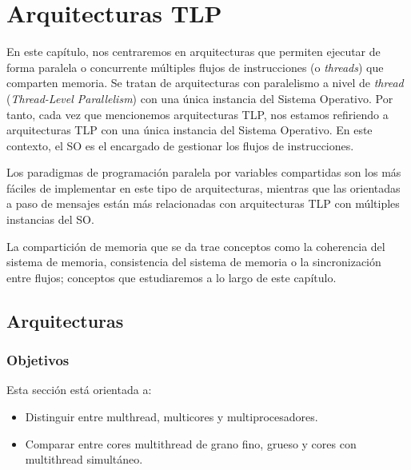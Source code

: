 \chapter{Arquitecturas TLP}
En este capítulo, nos centraremos en arquitecturas que permiten ejecutar de forma paralela o concurrente múltiples flujos de instrucciones (o \emph{threads}) que comparten memoria. Se tratan de arquitecturas con paralelismo a nivel de \emph{thread} (\emph{Thread-Level Parallelism}) con una única instancia del Sistema Operativo. Por tanto, cada vez que mencionemos arquitecturas TLP, nos estamos refiriendo a arquitecturas TLP con una única instancia del Sistema Operativo. En este contexto, el SO es el encargado de gestionar los flujos de instrucciones.

Los paradigmas de programación paralela por variables compartidas son los más fáciles de implementar en este tipo de arquitecturas, mientras que las orientadas a paso de mensajes están más relacionadas con arquitecturas TLP con múltiples instancias del SO\@.

La compartición de memoria que se da trae conceptos como la coherencia del sistema de memoria, consistencia del sistema de memoria o la sincronización entre flujos; conceptos que estudiaremos a lo largo de este capítulo.

\section{Arquitecturas}
\subsection{Objetivos}
Esta sección está orientada a:
\begin{itemize}
    \item Distinguir entre multhread, multicores y multiprocesadores.
    \item Comparar entre cores multithread de grano fino, grueso y cores con multithread simultáneo.
\end{itemize}


